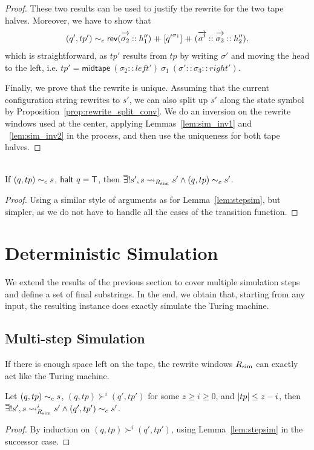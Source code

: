 \begin{proof}
  These two results can be used to justify the rewrite for the two tape halves. Moreover, we have to show that 
  \begin{align*}
    (q', tp') \reprc{} \rev{(\polpos{\sigma_2} :: h_1'')} \concat [{q'}^{\sigma_1}] \concat (\polpos{\sigma'} :: \polpos{\sigma_3} :: h_2''), 
  \end{align*}
  which is straightforward, as $tp'$ results from $tp$ by writing $\sigma'$ and moving the head to the left, i.e.
    $tp' = \textsf{midtape}~(\sigma_2 :: left')~\sigma_1~(\sigma' :: \sigma_3 :: right')$.

  Finally, we prove that the rewrite is unique. Assuming that the current configuration string rewrites to $s'$, we can also split up $s'$ along the state symbol by Proposition~\ref{prop:rewrite_split_conv}. We do an inversion on the rewrite windows used at the center, applying Lemmas~\ref{lem:sim_inv1} and ~\ref{lem:sim_inv2} in the process, and then use the uniqueness for both tape halves.
\end{proof}

\begin{lemma}\label{lem:haltsim}~\\
  If $(q, tp) \sim_c{} s$, $\textsf{halt}~q = \mathsf{T}$, then $\overline{\exists}! s', s \rightsquigarrow_{R_{\text{sim}}} s' \land (q, tp) \sim_c{} s'$.
\end{lemma}
\begin{proof}
  Using a similar style of arguments as for Lemma~\ref{lem:stepsim}, but simpler, as we do not have to handle all the cases of the transition function.
\end{proof}

\section{Deterministic Simulation}
We extend the results of the previous section to cover multiple simulation steps and define a set of final substrings. In the end, we obtain that, starting from any input, the resulting \PR{} instance does exactly simulate the Turing machine.

\subsection{Multi-step Simulation}
If there is enough space left on the tape, the rewrite windows $R_{\text{sim}}$ can exactly act like the Turing machine.

\begin{lemma}\label{lem:multistep_complete}
  Let $(q, tp) \sim_c{} s$, $(q, tp) \succ^i (q', tp')$ for some $z \ge i \ge 0$, and $|tp| \le z - i$, then $\overline{\exists}! s', s \rightsquigarrow_{R_{\text{sim}}}^i s' \land (q', tp') \sim_c{} s'$. 
\end{lemma}
\begin{proof}
  By induction on $(q, tp) \succ^i (q', tp')$, using Lemma~\ref{lem:stepsim} in the successor case. 
\end{proof}

